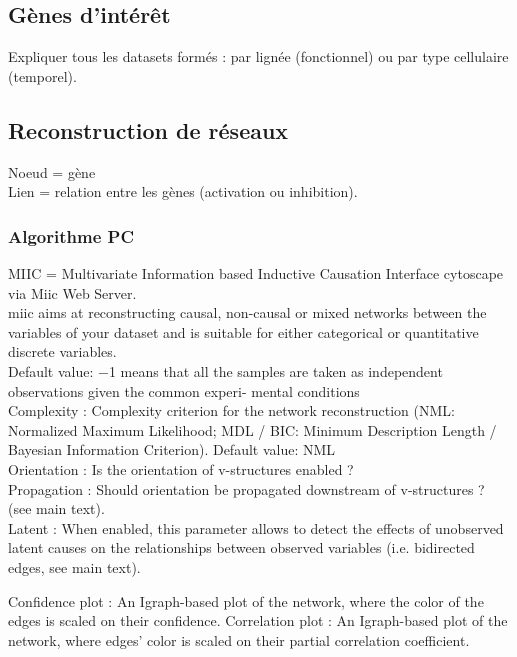 \documentclass[fleqn,11pt]{SelfArx} %
\begin{document}
\subsection{Gènes d'intérêt}
Expliquer tous les datasets formés : par lignée (fonctionnel) ou par type cellulaire (temporel). 


\subsection{Reconstruction de réseaux}
Noeud = gène \\
Lien = relation entre les gènes (activation ou inhibition). 
\subsubsection{Algorithme PC}
MIIC = Multivariate Information based Inductive Causation
Interface cytoscape via Miic Web Server.  \\
miic aims at reconstructing causal, non-causal or mixed networks between the variables of your dataset and is suitable for either categorical or quantitative discrete variables. \\
Default value: −1 means that all the samples are taken as independent observations given the common experi- mental conditions \\
Complexity : Complexity criterion for the network reconstruction (NML: Normalized Maximum Likelihood; MDL / BIC: Minimum Description Length / Bayesian Information Criterion). Default value: NML \\
Orientation : Is the orientation of v-structures enabled ? \\
Propagation : Should orientation be propagated downstream of v-structures ? (see main text). \\
Latent : When enabled, this parameter allows to detect the effects of unobserved latent causes on the relationships between observed variables (i.e. bidirected edges, see main text).

Confidence plot : An Igraph-based plot of the network, where the color of the edges is scaled on their confidence.
Correlation plot : An Igraph-based plot of the network, where edges’ color is scaled on their partial correlation coefficient.
\end{document}
